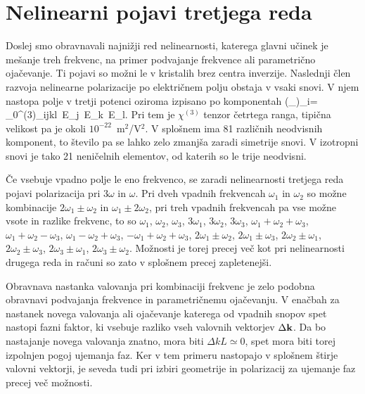 \section{Nelinearni pojavi tretjega reda}
Doslej smo obravnavali najnižji red nelinearnosti, katerega glavni
učinek je mešanje treh frekvenc, na primer podvajanje frekvence ali
parametrično ojačevanje. Ti pojavi so možni le v kristalih brez centra
inverzije. Naslednji člen razvoja nelinearne polarizacije po električnem
polju obstaja v vsaki snovi. V njem nastopa polje v tretji potenci
oziroma izpisano po komponentah
\beq
\left(_{}\right)_i= \epsilon_{0}\chi^{(3)}_{ijkl} \,E_j \,E_k\, E_l.
\eeq
Pri tem je $\chi^{(3)}$ tenzor četrtega ranga, tipična velikost pa je okoli 
$10^{-22}$~m$^2$/V$^2$. V splošnem ima 81 različnih neodvisnih komponent, to
število pa se lahko zelo zmanjša zaradi simetrije snovi. V izotropni snovi je tako
21 neničelnih elementov, od katerih so le trije neodvisni. 

Če vsebuje vpadno polje le eno frekvenco, se zaradi nelinearnosti tretjega
reda pojavi polarizacija pri 3$\omega$ in $\omega$. Pri dveh vpadnih
frekvencah $\omega_{1}$ in $\omega_{2}$ so možne kombinacije $2\omega_{1}\pm\omega_{2}$
in $\omega_{1}\pm2\omega_{2}$, pri treh vpadnih frekvencah pa vse
možne vsote in razlike frekvenc, to so $\omega_1$, $\omega_2$, $\omega_3$, 
$3\omega_1$, $3 \omega_2$, $3\omega_3$, 
$\omega_1 + \omega_2 + \omega_3$, $\omega_1 + \omega_2 - \omega_3$, 
$\omega_1 - \omega_2 + \omega_3$, $- \omega_1 + \omega_2 + \omega_3$, 
$2 \omega_1\pm\omega_2$, $2 \omega_1\pm\omega_3$, $2 \omega_2\pm\omega_1$,
$2 \omega_2\pm\omega_3$, $2 \omega_3\pm\omega_1$, $2 \omega_3\pm\omega_2$.
Možnosti je torej precej več kot pri nelinearnosti drugega reda in računi so zato 
v splošnem precej zapletenejši.

Obravnava nastanka valovanja pri
kombinaciji frekvenc je zelo podobna obravnavi podvajanja frekvence in parametričnemu
ojačevanju. V enačbah za nastanek novega valovanja ali ojačevanje
katerega od vpadnih snopov spet nastopi fazni faktor, ki vsebuje razliko
vseh valovnih vektorjev $\Delta{\bf k}$. Da bo nastajanje novega
valovanja znatno, mora biti $\Delta kL\simeq0$, spet mora biti torej
izpolnjen pogoj ujemanja faz. Ker v tem primeru nastopajo v splošnem štirje
valovni vektorji, je seveda tudi pri izbiri geometrije in polarizacij
za ujemanje faz precej več možnosti.

